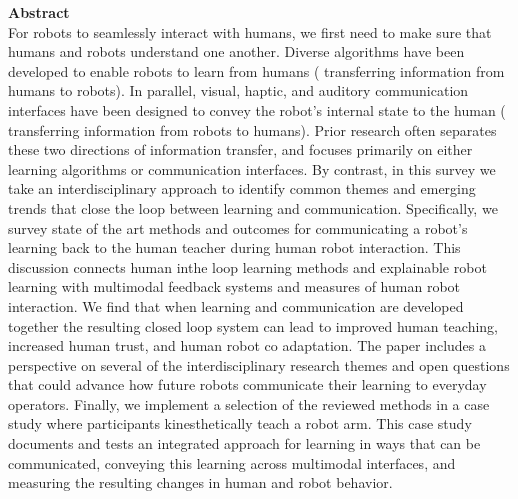 \documentclass[report.tex]{subfiles}
\begin{document}
\noindent\textbf{Abstract} \\
For robots to seamlessly interact with humans, we first need to make sure that humans and robots understand one another. Diverse algorithms have been developed to enable robots to learn from humans ( transferring information from humans to robots). In parallel, visual, haptic, and auditory communication interfaces have been designed to convey the robot’s internal state to the human (  transferring information from robots to humans). Prior research often separates these two directions of information transfer, and focuses primarily on either learning algorithms or communication interfaces. By contrast, in this survey we take an interdisciplinary approach to identify common themes and emerging trends that close the loop between learning and communication. Specifically, we survey state of the art methods and outcomes for communicating a robot’s learning back to the human teacher during human robot interaction. This discussion connects human inthe loop learning methods and explainable robot learning with multimodal feedback systems and measures of human robot interaction. We find that when learning and communication are developed together the resulting closed loop system can lead to improved human teaching, increased human trust, and human robot co adaptation. The paper includes a perspective on several of the interdisciplinary research themes and open questions that could advance how future robots communicate their learning to everyday operators. Finally, we implement a selection of the reviewed methods in a case study where participants kinesthetically teach a robot arm. This case study documents and tests an integrated approach for learning in ways that can be communicated, conveying this learning across multimodal interfaces, and measuring the resulting changes in human and robot behavior.\\
\end{document}
